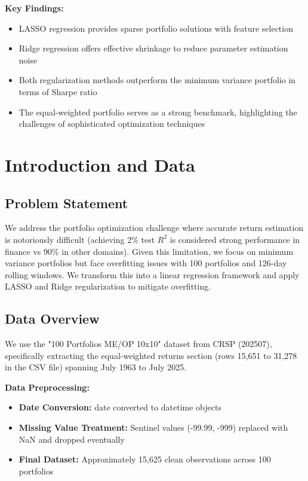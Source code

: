 \documentclass[12pt]{article}
\begin{document}
\textbf{Key Findings:}
\begin{itemize}
    \item LASSO regression provides sparse portfolio solutions with feature selection
    \item Ridge regression offers effective shrinkage to reduce parameter estimation noise
    \item Both regularization methods outperform the minimum variance portfolio in terms of Sharpe ratio
    \item The equal-weighted portfolio serves as a strong benchmark, highlighting the challenges of sophisticated optimization techniques
\end{itemize}

\section{Introduction and Data}

\subsection{Problem Statement}
We address the portfolio optimization challenge where accurate return estimation is notoriously difficult (achieving 2\% test $R^2$ is considered strong performance in finance vs 90\% in other domains). Given this limitation, we focus on minimum variance portfolios but face overfitting issues with 100 portfolios and 126-day rolling windows. We transform this into a linear regression framework and apply LASSO and Ridge regularization to mitigate overfitting.

\subsection{Data Overview}
We use the "100 Portfolios ME/OP 10x10" dataset from CRSP (202507), specifically extracting the equal-weighted returns section (rows 15,651 to 31,278 in the CSV file) spanning July 1963 to July 2025.

\textbf{Data Preprocessing:}
\begin{itemize}
    \item \textbf{Date Conversion:} date converted to datetime objects
    \item \textbf{Missing Value Treatment:} Sentinel values (-99.99, -999) replaced with NaN and dropped eventually
    \item \textbf{Final Dataset:} Approximately 15,625 clean observations across 100 portfolios
\end{itemize}
\end{document}
